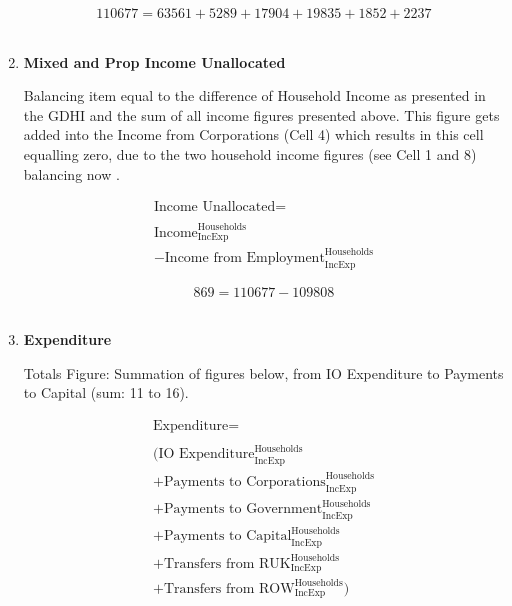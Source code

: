 \begin{enumerate}
\begin{equation} \nonumber
110677 = 63561+5289+17904+19835+1852+2237
\end{equation}\\


\item \textbf {Mixed and Prop Income Unallocated}

Balancing item equal to the difference of Household Income as presented in the GDHI \cite{ONS2012} and the sum of all income figures presented above. This figure gets added into the Income from Corporations (Cell 4) which results in this cell equalling zero, due to the two household income figures (see Cell 1 and 8) balancing now \cite{ONS2011b}.

\begin{equation}
\begin{split}
\text{Income Unallocated} =  \\ \\
\text{Income}^\text{Households}_\text{IncExp}\\
-\text{Income from Employment}^\text{Households}_\text{IncExp}
\end{split} \label{eq:2.5.13}
\end{equation}


\begin{equation} \nonumber
869 = 110677-109808
\end{equation}\\


\pagebreak

\item \textbf {Expenditure}

Totals Figure: Summation of figures below, from IO Expenditure to Payments to Capital (sum: 11 to 16).

\begin{equation}
\begin{split}
\text{Expenditure} =  \\ \\
(\text{IO Expenditure}^\text{Households}_\text{IncExp}\\
+\text{Payments to Corporations}^\text{Households}_\text{IncExp}\\
+\text{Payments to Government}^\text{Households}_\text{IncExp}\\
+\text{Payments to Capital}^\text{Households}_\text{IncExp}\\
+\text{Transfers from RUK}^\text{Households}_\text{IncExp}\\
+\text{Transfers from ROW}^\text{Households}_\text{IncExp})
\end{split} \label{eq:2.5.14}
\end{equation}


\end{enumerate}
